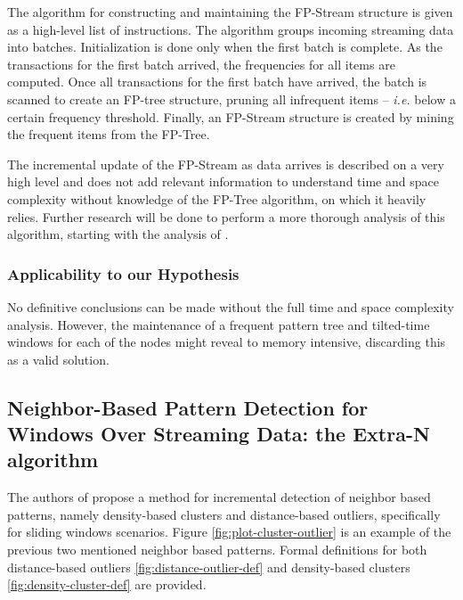 The algorithm for constructing and maintaining the FP-Stream structure is given as a high-level list of instructions. The algorithm groups incoming streaming data into batches. Initialization is done only when the first batch is complete. As the transactions for the first batch arrived, the frequencies for all items are computed. Once all transactions for the first batch have arrived, the batch is scanned to create an FP-tree structure, pruning all infrequent items -- \textit{i.e.} below a certain frequency threshold. Finally, an FP-Stream structure is created by mining the frequent items from the FP-Tree.

The incremental update of the FP-Stream as data arrives is described on a very high level and does not add relevant information to understand time and space complexity without knowledge of the FP-Tree algorithm, on which it heavily relies. Further research will be done to perform a more thorough analysis of this algorithm, starting with the analysis of \cite{Han-FP-tree}.

\subsubsection*{Applicability to our Hypothesis}

No definitive conclusions can be made without the full time and space complexity analysis. However, the maintenance of a frequent pattern tree and tilted-time windows for each of the nodes might reveal to memory intensive, discarding this as a valid solution.

\subsection{Neighbor-Based Pattern Detection for Windows Over Streaming Data: the Extra-N algorithm}

The authors of \cite{Yang-Neighbor-Based-Pattern-Detection} propose a method for incremental detection of neighbor based patterns, namely density-based clusters and distance-based outliers, specifically for sliding windows scenarios. Figure \ref{fig:plot-cluster-outlier} is an example of the previous two mentioned neighbor based patterns. Formal definitions for both distance-based outliers \ref{fig:distance-outlier-def} and density-based clusters \ref{fig:density-cluster-def} are provided.

